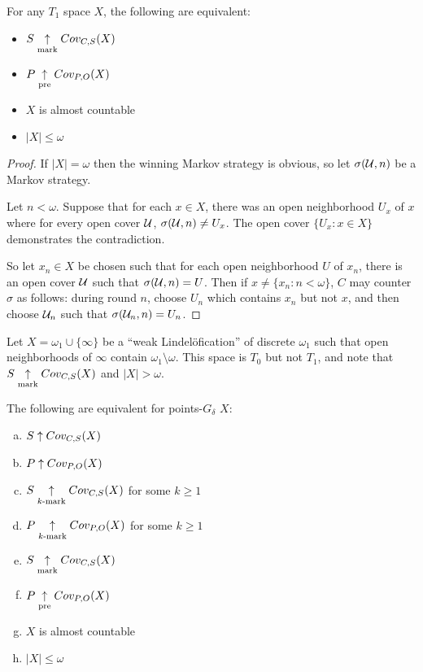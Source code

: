   \begin{theorem}
    For any $T_1$ space $X$, the following are equivalent:
    \begin{itemize}
      \item $S\underset{\text{mark}}{\uparrow}Cov_{C,S}(X)$
      \item $P\underset{\text{pre}}{\uparrow}Cov_{P,O}(X)$
      \item $X$ is almost countable
      \item $|X|\leq\omega$
    \end{itemize}
  \end{theorem}

  \begin{proof}
    If $|X|=\omega$ then the winning Markov strategy is obvious, so let $\sigma(\mathcal{U},n)$ be a Markov strategy.

    Let $n<\omega$. Suppose that for each $x\in X$, there was an open neighborhood $U_x$ of $x$ where for every open cover $\mathcal{U}$, $\sigma(\mathcal{U},n) \not= U_x$. The open cover $\{U_x : x\in X\}$ demonstrates the contradiction.

    So let $x_n\in X$ be chosen such that for each open neighborhood $U$ of $x_n$, there is an open cover $\mathcal{U}$ such that $\sigma(\mathcal{U},n)=U$. Then if $x\not=\{x_n : n<\omega\}$, $C$ may counter $\sigma$ as follows: during round $n$, choose $U_n$ which contains $x_n$ but not $x$, and then choose $\mathcal{U}_n$ such that $\sigma(\mathcal{U}_n,n)=U_n$.
  \end{proof}

  \begin{example}
    Let $X=\omega_1\cup\{\infty\}$ be a ``weak Lindel\"ofication'' of discrete $\omega_1$ such that open neighborhoods of $\infty$ contain $\omega_1\setminus\omega$. This space is $T_0$ but not $T_1$, and note that $S\underset{\text{mark}}{\uparrow}Cov_{C,S}(X)$ and $|X|>\omega$.
  \end{example}

  \begin{theorem}
    The following are equivalent for points-$G_\delta$ $X$:
      \begin{enumerate}[(a)]
        \item $S\uparrow Cov_{C,S}(X)$
        \item $P\uparrow Cov_{P,O}(X)$
        \item $S\underset{k\text{-mark}}{\uparrow}Cov_{C,S}(X)$ for some $k\geq 1$
        \item $P\underset{k\text{-mark}}{\uparrow}Cov_{P,O}(X)$ for some $k\geq 1$
        \item $S\underset{\text{mark}}{\uparrow}Cov_{C,S}(X)$
        \item $P\underset{\text{pre}}{\uparrow}Cov_{P,O}(X)$
        \item $X$ is almost countable
        \item $|X|\leq\omega$
      \end{enumerate}
  \end{theorem}

